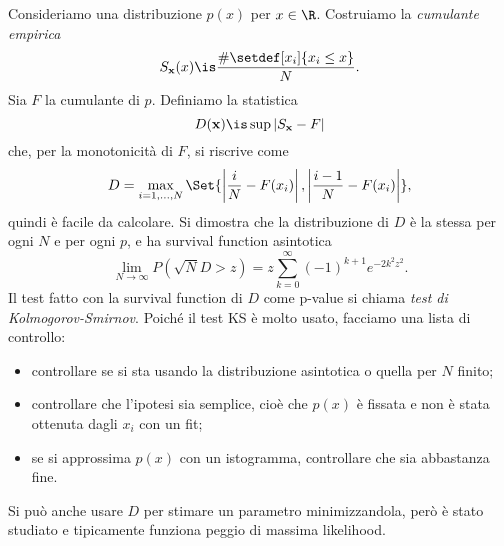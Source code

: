 Consideriamo una distribuzione $p(x)$ per $x\in\R$.
Costruiamo la \emph{cumulante empirica} 
\begin{equation*}
	S_{\mathbf x}(x)
	\is \frac {\#\setdef[x_i]{x_i\le x}} N.
\end{equation*}
Sia $F$ la cumulante di $p$.
Definiamo la statistica
\begin{equation*}
	D(\mathbf x)
	\is \sup|S_\mathbf x-F|
\end{equation*}
che, per la monotonicità di $F$, si riscrive come
\begin{equation*}
	D = \max_{i=1,\dotsc,N} \Set{\left|\frac iN-F(x_i)\right|, \left|\frac{i-1}N-F(x_i)\right|},
\end{equation*}
quindi è facile da calcolare.
Si dimostra che la distribuzione di $D$ è la stessa per ogni $N$ e per ogni $p$,
e ha survival function asintotica
\begin{equation*}
	\lim_{N\to\infty} P(\sqrt N D>z)
	= z \sum_{k=0}^\infty (-1)^{k+1} e^{-2k^2z^2}.
\end{equation*}
Il test fatto con la survival function di $D$ come p-value si chiama \emph{test di Kolmogorov-Smirnov}.
Poiché il test KS è molto usato,
facciamo una lista di controllo:
\begin{itemize}
	\item controllare se si sta usando la distribuzione asintotica o quella per $N$ finito;
	\item controllare che l'ipotesi sia semplice,
	cioè che $p(x)$ è fissata e non è stata ottenuta dagli $x_i$ con un fit;
	\item se si approssima $p(x)$ con un istogramma, controllare che sia abbastanza fine.
\end{itemize}
Si può anche usare $D$ per stimare un parametro minimizzandola,
però è stato studiato e tipicamente funziona peggio di massima likelihood.
